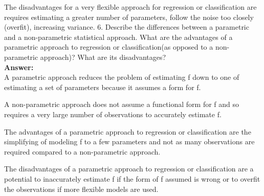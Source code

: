 \documentclass[12pt]{article}
\begin{document}
The disadvantages for a very flexible approach for regression or classification
are requires estimating a greater number of parameters, follow the noise too
closely (overfit), increasing variance.
6. Describe the differences between a parametric and a non-parametric statistical approach. What are the advantages of a parametric approach to regression or classification(as opposed to a non-parametric approach)? What are its disadvantages?\\
\textbf{Answer:}\\
A parametric approach reduces the problem of estimating f down to one of
estimating a set of parameters because it assumes a form for f.

A non-parametric approach does not assume a functional form for f and so
requires a very large number of observations to accurately estimate f.

The advantages of a parametric approach to regression or classification are the
simplifying of modeling f to a few parameters and not as many observations are
required compared to a non-parametric approach.

The disadvantages of a parametric approach to regression or classification
are a potential to inaccurately estimate f if the form of f assumed is wrong or
to overfit the observations if more flexible models are used.
\end{document}
